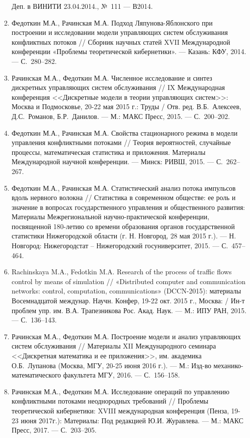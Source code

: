 \begin{enumerate}
	Деп. в ВИНИТИ 23.04.2014., №~111 — В2014.
	\item Федоткин М.А., Рачинская М.А. Подход Ляпунова-Яблонского при построении
	и исследовании модели управляющих систем обслуживания конфликтных	потоков // Сборник научных статей XVII Международной конференции «Проблемы теоретической кибернетики». — Казань: КФУ, 2014. — С.~280–282.
	\item Рачинская М.А., Федоткин М.А. Численное исследование и синтез дискретных управляющих систем обслуживания // IX Международная конференция <<Дискретные модели в теории управляющих систем>>: Москва и Подмосковье, 20-22 мая 2015 г.: Труды / Отв. ред. В.Б.~Алексеев, Д.С.~Романов, Б.Р.~Данилов. — М.: МАКС Пресс, 2015. — С.~200–202.
	\item Федоткин М.А., Рачинская М.А. Свойства стационарного режима в модели управления конфликтными потоками // Теория вероятностей, случайные процессы, математическая статистика и приложения. Материалы Международной научной конференции. — Минск: РИВШ, 2015. —	С.~262–267.
	\item Федоткин М.А., Рачинская М.А. Статистический анализ потока импульсов вдоль нервного волокна // Статистика в современном обществе: ее роль и значение в вопросах государственного управления и общественного
	развития: Материалы Межрегиональной научно-практической конференции, посвященной 180-летию со времени образования органов государственной статистики Нижегородской области (г. Н. Новгород, 28 мая	2015 г.). — Н. Новгород: Нижегородстат – Нижегородский госуниверситет, 2015. — С.~457–464.
	\item Rachinskaya M.A., Fedotkin M.A. Research of the process of traffic flows control by means of simulation // «Distributed computer and communication	networks: control, computation, communications» (DCCN-2015): материалы
	Восемнадцатой междунар. Научн. Конфер, 19-22 окт. 2015 г., Москва: / Ин-т проблем упр. им. В.А. Трапезникова Рос. Акад. Наук. — М.: ИПУ РАН, 2015. — С.~136–143.
	\item Рачинская М.А., Федоткин М.А. Построение модели и анализ управляющих систем обслуживания // Материалы XII Международного семинара <<Дискретная математика и ее приложения>>, им. академика О.Б.~Лупанова
	(Москва, МГУ, 20-25 июня 2016 г.). — М.: Изд-во механико-математического факультета МГУ, 2016. — С.~156–158.
	\item Рачинская М.А., Федоткин М.А. Исследование операций по управлению конфликтными потоками неоднородных требований // Проблемы теоретической кибернетики: XVIII международная конференция (Пенза, 19-23 июня 2017г.): Материалы: Под редакцией Ю.И. Журавлева. — М.: МАКС Пресс, 2017. — С.~203–205.

\end{enumerate}
